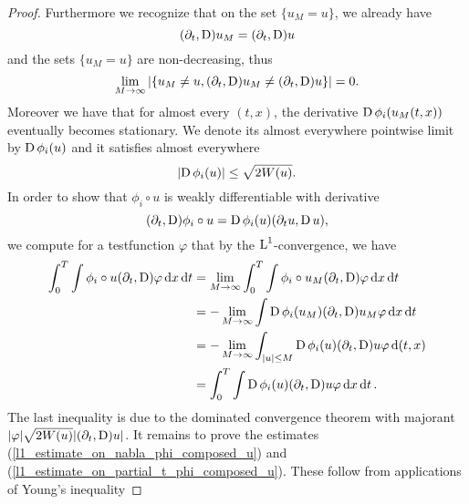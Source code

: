 \begin{proof}
	Furthermore we recognize that on the set $ \{ u_{M } = u \} $, we already have
	\begin{equation*}
		( \partial_{ t } , \operatorname{D} ) u_{ M }
		=
		( \partial_{ t } , \operatorname{D} ) u
	\end{equation*}
	and the sets $ \{ u_{ M } = u \} $ are non-decreasing, thus
	\begin{equation*}
		\lim_{ M \to \infty }
		\abs{
			\left\{
				u_{ M } \neq u, ( \partial_{ t } , \operatorname{D} ) u_{ M } \neq ( 
				\partial_{ t }, \operatorname{D} ) u 
			\right\}
		}
		=
		0.
	\end{equation*}
	Moreover we have that for almost every $ ( t, x ) $, the derivative $ \operatorname{D} 
	\phi_{ i } ( u_{ M } ( t , x ) ) $ eventually becomes stationary. We denote 
	its almost everywhere pointwise limit by $ \operatorname{D} \phi_{ i } ( u ) $ and it 
	satisfies almost everywhere
	\begin{equation*}
		\abs{
			\operatorname{D} \phi_{ i } ( u ) 
		}
		\leq
		\sqrt{ 2 W ( u ) }.
	\end{equation*}
	In order to show that $ \phi_{ i } \circ u $ is weakly differentiable with derivative 
	\begin{equation*}
		( \partial_{ t } , \operatorname{D} ) \phi_{ i } \circ u
		=
		\operatorname{D} \phi_{ i } ( u ) ( \partial_{ t } u, \operatorname{D} u ),
	\end{equation*}
	we compute for a testfunction $ \varphi $ that by the $ \operatorname{L}^{ 1 } $-convergence, we have
	\begin{align*}
		\int_{ 0 }^{ T }
		\int
			\phi_{ i } \circ u
			( \partial_{ t } , \operatorname{D} ) \varphi
		\dd{ x}
		\dd{ t }
		&
		=
		\lim_{ M \to \infty }
			\int_{0 }^{ T }
				\int
					\phi_{ i } \circ u_{ M }
					( \partial_{ t } , \operatorname{D}) \varphi
				\dd{ x }
			\dd{ t }
		\\
		& =
		- \lim_{ M \to \infty }
			\int
				\operatorname{D} \phi_{ i } ( u_{ M } )
				( \partial_{ t } , \operatorname{D} ) u_{ M }
				\varphi
			\dd{ x }
		\dd{ t }
		\\
		& =
		- \lim_{ M \to \infty }
			\int_{ \abs{ u } \leq M }
				\operatorname{D} \phi_{ i } ( u ) 
				( \partial_{ t } , \operatorname{D} ) u
				\varphi
			\dd{ ( t, x ) }
		\\
		& =
		\int_{ 0 }^{ T }
			\int
				\operatorname{D} \phi_{ i } ( u ) 
				( \partial_{ t } , \operatorname{D} ) u
				\varphi
			\dd{ x }
		\dd{ t }.
	\end{align*}
	The last inequality is due to the dominated convergence theorem with 
	majorant $ \abs{ \varphi } \sqrt{ 2 W ( u ) } \abs{ ( \partial_{ t } , 
	\operatorname{D} ) u } $.
	It remains to prove the estimates (\ref{l1_estimate_on_nabla_phi_composed_u}) and (\ref{l1_estimate_on_partial_t_phi_composed_u}). These follow from applications of Young's inequality

\end{proof}
